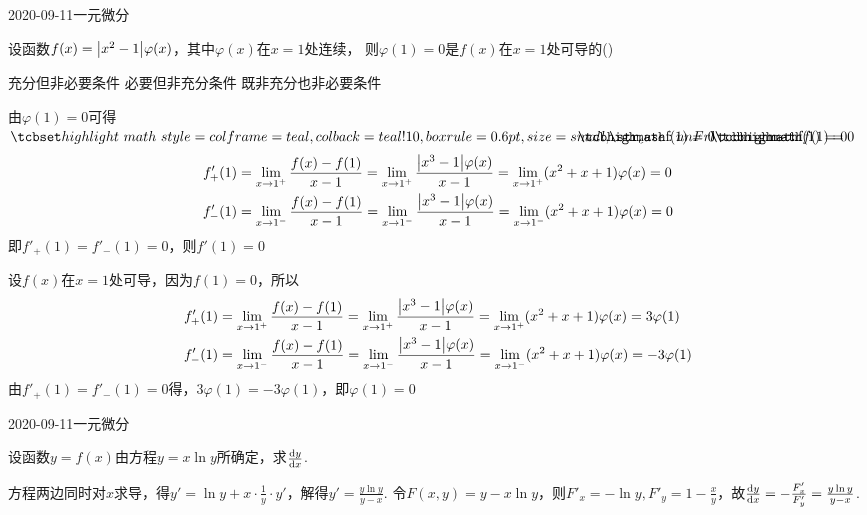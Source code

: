 \documentclass{ctexart}
\begin{document}
\begin{mathques}{2020-09-11}{一元微分}
\begin{ques}
  设函数$f(x) = \abs{x^2 - 1}\varphi (x)$，其中$\varphi (x) $在$x = 1$处连续，
  则$\varphi (1) = 0$是$f(x)$在$x = 1$处可导的(\quad)
  \begin{multichoice}
    \task {}
    \task 充分但非必要条件
    \task 必要但非充分条件
    \task 既非充分也非必要条件
  \end{multichoice}
\end{ques}
\begin{solu}
  \par
  由$\varphi(1) = 0$可得$\mathhint{f(1) = 0}$
  \begin{align*}
    f'_+(1) &= \lim_{x \to 1^+} \frac{f(x) - f(1)}{x - 1}
    = \lim_{x \to 1^+} \frac{\abs{x^3 - 1}\varphi(x)}{x - 1}
    = \lim_{x \to 1^+} (x^2 + x + 1)\varphi(x) = 0\\
    f'_-(1) &= \lim_{x \to 1^-} \frac{f(x) - f(1)}{x - 1}
    = \lim_{x \to 1^-} \frac{\abs{x^3 - 1}\varphi(x)}{x - 1}
    = \lim_{x \to 1^-} (x^2 + x + 1)\varphi(x) = 0
  \end{align*}
  即$f'_+(1) = f'_-(1) = 0$，则$f'(1) = 0$

  \par
  设$f(x)$在$x = 1$处可导，因为$f(1) = 0$，所以
  \begin{align*}
    f'_+(1) &= \lim_{x \to 1^+} \frac{f(x) - f(1)}{x - 1}
    = \lim_{x \to 1^+} \frac{\abs{x^3 - 1}\varphi(x)}{x - 1}
    = \lim_{x \to 1^+} (x^2 + x + 1)\varphi(x) = 3\varphi(1)\\
    f'_-(1) &= \lim_{x \to 1^-} \frac{f(x) - f(1)}{x - 1}
    = \lim_{x \to 1^-} \frac{\abs{x^3 - 1}\varphi(x)}{x - 1}
    = \lim_{x \to 1^-} (x^2 + x + 1)\varphi(x) = -3\varphi(1)
  \end{align*}
  由$f'_+(1) = f'_-(1) = 0$得，$3\varphi(1) = -3\varphi(1)$，即$\varphi(1) = 0$
\end{solu}
\end{mathques}

\begin{mathques}{2020-09-11}{一元微分}
\begin{ques}
  设函数$y = f(x)$由方程$y = x\ln y$所确定，求$\dv{y}{x}$.
\end{ques}
\begin{solu}
\mathmethod 方程两边同时对$x$求导，得$y' = \ln y + x\cdot \frac{1}{y} \cdot
y'$，解得$y' = \frac{y \ln y}{y - x}$.
\mathmethod 令$F(x, y) = y - x\ln y$，则$F'_x = - \ln y, F'_y = 1 - \frac{x}{y}
$，故$\dv{y}{x} = - \frac{F'_x}{F'_y} = \frac{y\ln y}{y - x}$.
\end{solu}
\end{mathques}
\end{document}
